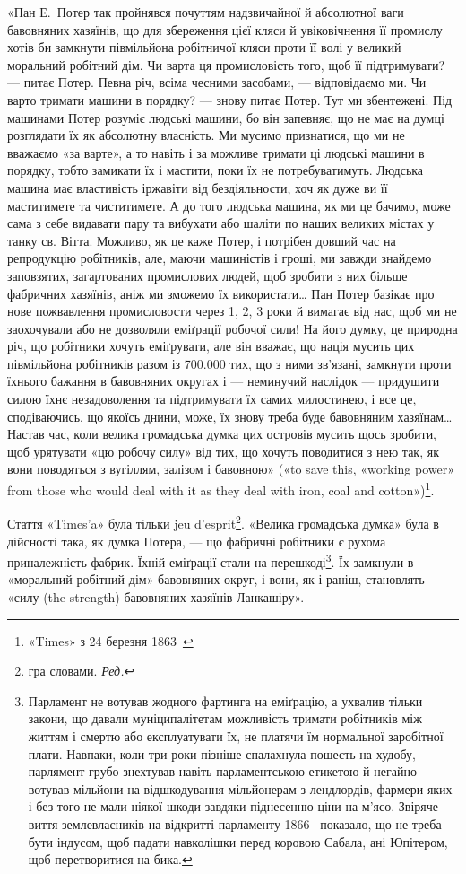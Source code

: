 «Пан Е.~Потер так пройнявся почуттям надзвичайної й абсолютної
ваги бавовняних хазяїнів, що для збереження цієї кляси
й увіковічнення її промислу хотів би замкнути півмільйона робітничої
кляси проти її волі у великий моральний робітний дім.
Чи варта ця промисловість того, щоб її підтримувати? — питає
Потер. Певна річ, всіма чесними засобами, — відповідаємо ми.
Чи варто тримати машини в порядку? — знову питає Потер.
Тут ми збентежені. Під машинами Потер розуміє людські машини,
бо він запевняє, що не має на думці розглядати їх як абсолютну
власність. Ми мусимо признатися, що ми не вважаємо «за варте»,
а то навіть і за можливе тримати ці людські машини в порядку,
тобто замикати їх і мастити, поки їх не потребуватимуть. Людська
машина має властивість іржавіти від бездіяльности, хоч
як дуже ви її маститимете та чиститимете. А до того людська
машина, як ми це бачимо, може сама з себе видавати пару та вибухати
або шаліти по наших великих містах у танку св. Вітта.
Можливо, як це каже Потер, і потрібен довший час на репродукцію
робітників, але, маючи машиністів і гроші, ми завжди
знайдемо заповзятих, загартованих промислових людей, щоб
зробити з них більше фабричних хазяїнів, аніж ми зможемо їх
використати\dots{} Пан Потер базікає про нове пожвавлення промисловости
через 1, 2, 3 роки й вимагає від нас, щоб ми не заохочували
або не дозволяли еміґрації робочої сили! На його думку,
це природна річ, що робітники хочуть еміґрувати, але він вважає,
що нація мусить цих півмільйона робітників разом із \num{700.000} тих,
що з ними зв’язані, замкнути проти їхнього бажання в бавовняних
округах і — неминучий наслідок — придушити силою їхнє
незадоволення та підтримувати їх самих милостинею, і все це,
сподіваючись, що якоїсь днини, може, їх знову треба буде бавовняним
хазяїнам\dots{} Настав час, коли велика громадська думка
цих островів мусить щось зробити, щоб урятувати «цю робочу
силу» від тих, що хочуть поводитися з нею так, як вони поводяться
з вугіллям, залізом і бавовною» («to save this, «working
power» from those who would deal with it as they deal with iron,
coal and cotton»)\footnote{
«Times» з 24 березня 1863~
}.

Стаття «Times’a» була тільки jeu d’esprit\footnote*{
гра словами. \emph{Ред.}
}. «Велика громадська
думка» була в дійсності така, як думка Потера, — що фабричні
робітники є рухома приналежність фабрик. Їхній еміґрації
стали на перешкоді\footnote{
Парламент не вотував жодного фартинга на еміґрацію, а ухвалив
тільки закони, що давали муніципалітетам можливість тримати робітників
між життям і смертю або експлуатувати їх, не платячи їм нормальної
заробітної плати. Навпаки, коли три роки пізніше спалахнула пошесть
на худобу, парлямент грубо знехтував навіть парламентською етикетою й
негайно вотував мільйони на відшкодування мільйонерам з лендлордів,
фармери яких і без того не мали ніякої шкоди завдяки піднесенню ціни
на м’ясо. Звіряче виття землевласників на відкритті парламенту 1866~
показало, що не треба бути індусом, щоб падати навколішки перед коровою
Сабала, ані Юпітером, щоб перетворитися на бика.
}. Їх замкнули в «моральний робітний
дім» бавовняних округ, і вони, як і раніш, становлять «силу
(the strength) бавовняних хазяїнів Ланкашіру».

